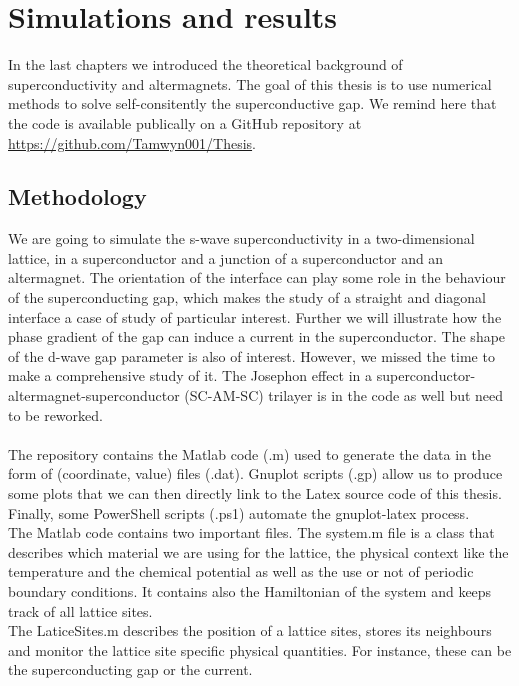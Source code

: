 \documentclass[../main.tex]{subfile}
\begin{document}
\section{Simulations and results}
In the last chapters we introduced the theoretical background of superconductivity and altermagnets. 
The goal of this thesis is to use numerical methods to solve self-consitently the superconductive gap.
We remind here that the code is available publically on a GitHub repository at \url{https://github.com/Tamwyn001/Thesis}.\\

\subsection{Methodology}
We are going to simulate the s-wave superconductivity in a two-dimensional lattice,
in a superconductor and a junction of a superconductor and an altermagnet. 
The orientation of the interface can play some role in the behaviour of the superconducting gap, which 
makes the study of a straight and diagonal interface a case of study of particular interest. 
Further we will illustrate how the phase gradient of the gap can induce a current in the superconductor.
The shape of the d-wave gap parameter is also of interest. However, we missed the time to make a comprehensive study of it.
The Josephon effect in a superconductor-altermagnet-superconductor (SC-AM-SC) trilayer is in the code as well but need to be reworked.\\
\\    

The repository contains the Matlab code (.m) used to generate the data in the form of (coordinate, value) files (.dat).
Gnuplot scripts (.gp) allow us to produce some plots that we can then directly link to the Latex source code
of this thesis. Finally, some PowerShell scripts (.ps1) automate the gnuplot-latex process.\\

The Matlab code contains two important files. The system.m file is a class that describes which
 material we are using for the lattice, the physical context like the temperature and the chemical potential
as well as the use or not of periodic boundary conditions. It contains also the Hamiltonian of the system
and keeps track of all lattice sites.\\
The LaticeSites.m describes the position of a lattice sites, stores its neighbours and monitor the lattice
site specific physical quantities. For instance, these can be the superconducting gap or the current.\\
\end{document}

